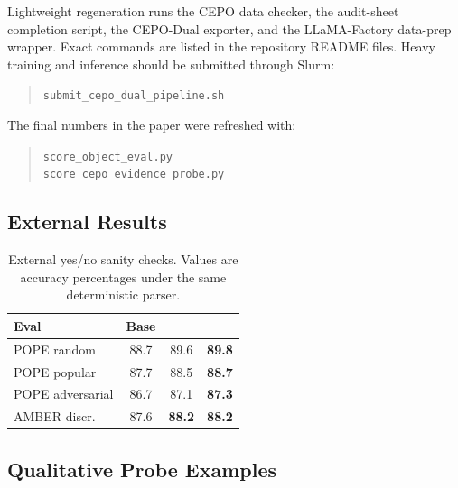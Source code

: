 Lightweight regeneration runs the CEPO data checker, the audit-sheet
completion script, the CEPO-Dual exporter, and the LLaMA-Factory data-prep
wrapper. Exact commands are listed in the repository README files.
Heavy training and inference should be submitted through Slurm:
\begin{quote}
\footnotesize
\texttt{submit\_cepo\_dual\_pipeline.sh}
\end{quote}
The final numbers in the paper were refreshed with:
\begin{quote}
\footnotesize
\texttt{score\_object\_eval.py}\\
\texttt{score\_cepo\_evidence\_probe.py}
\end{quote}

\subsection{External Results}

\begin{table}[ht]
\centering
\footnotesize
\begin{tabular}{lccc}
\toprule
Eval & Base & \answerdpo{} & \cepodual{} \\
\midrule
POPE random & 88.7 & 89.6 & \textbf{89.8} \\
POPE popular & 87.7 & 88.5 & \textbf{88.7} \\
POPE adversarial & 86.7 & 87.1 & \textbf{87.3} \\
AMBER discr. & 87.6 & \textbf{88.2} & \textbf{88.2} \\
\bottomrule
\end{tabular}
\caption{External yes/no sanity checks. Values are accuracy percentages under
the same deterministic parser.}
\label{tab:app_external}
\end{table}

\subsection{Qualitative Probe Examples}

